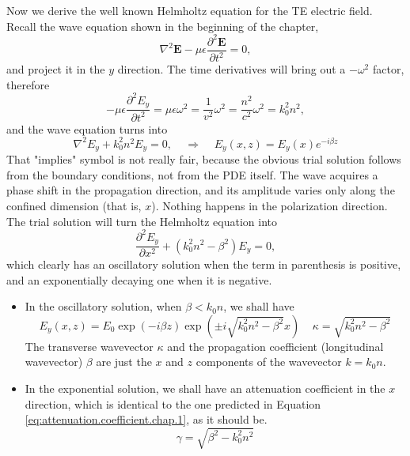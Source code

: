 Now we derive the well known Helmholtz equation for the TE electric field. Recall the wave equation shown in the beginning of the chapter,
\begin{equation}
    \nabla^2\textbf{E}-\mu\epsilon\frac{\partial^2\textbf{E}}{\partial t^2}=0,
\end{equation}
and project it in the $y$ direction. The time derivatives will bring out a $-\omega^2$ factor, therefore
\begin{equation}
    -\mu\epsilon\frac{\partial^2E_y}{\partial t^2}=\mu\epsilon\omega^2=\frac{1}{v^2}\omega^2=\frac{n^2}{c^2}\omega^2=k_0^2n^2,
\end{equation}
and the wave equation turns into
\begin{equation}
    \nabla^2E_y+k_0^2n^2E_y=0,\;\;\;\;\Rightarrow\;\;\;\;E_y(x,z)=E_y(x)e^{-i\beta z}
\end{equation}
That "implies" symbol is not really fair, because the obvious trial solution follows from the boundary conditions, not from the PDE itself. The wave acquires a phase shift in the propagation direction, and its amplitude varies only along the confined dimension (that is, $x$). Nothing happens in the polarization direction. The trial solution will turn the Helmholtz equation into
\begin{equation}
    \frac{\partial^2 E_y}{\partial x^2}+(k_0^2n^2-\beta^2)E_y=0,
    \label{eq:helmholtz.beta}
\end{equation}
which clearly has an oscillatory solution when the term in parenthesis is positive, and an exponentially decaying one when it is negative.
\begin{itemize}
    \item In the oscillatory solution, when $\beta<k_0n$, we shall have
    \begin{equation}
        E_y(x,z)=E_0\exp(-i\beta z)\exp\left(\pm i \sqrt{k_0^2n^2-\beta^2}x\right)\;\;\;\;\kappa=\sqrt{k_0^2n^2-\beta^2}
    \end{equation}
    The transverse wavevector $\kappa$ and the propagation coefficient (longitudinal wavevector) $\beta$ are just the $x$ and $z$ components of the wavevector $k=k_0n$.
    \item In the exponential solution, we shall have an attenuation coefficient in the $x$ direction, which is identical to the one predicted in Equation \ref{eq:attenuation.coefficient.chap.1}, as it should be.
    \begin{equation}
        \gamma=\sqrt{\beta^2-k_0^2n^2}
    \end{equation}
\end{itemize}

